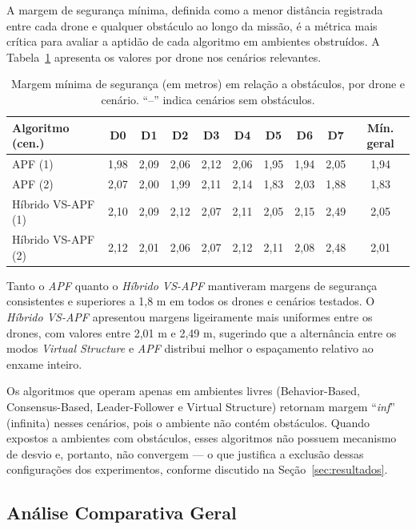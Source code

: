A margem de segurança mínima, definida como a menor distância registrada entre cada drone e qualquer obstáculo ao longo da missão, é a métrica mais crítica para avaliar a aptidão de cada algoritmo em ambientes obstruídos. A Tabela~\ref{tab:seguranca} apresenta os valores por drone nos cenários relevantes.

\begin{table}[ht]
\centering
\caption{Margem mínima de segurança (em metros) em relação a obstáculos, por drone e cenário. ``--'' indica cenários sem obstáculos.}
\label{tab:seguranca}
\renewcommand{\arraystretch}{1.1}
\begin{tabular}{|p{3.0cm}|c|c|c|c|c|c|c|c|c|}
\hline
\textbf{Algoritmo (cen.)} & \textbf{D0} & \textbf{D1} & \textbf{D2} & \textbf{D3} & \textbf{D4} & \textbf{D5} & \textbf{D6} & \textbf{D7} & \textbf{Mín. geral} \\ \hline
APF (1)          & 1,98 & 2,09 & 2,06 & 2,12 & 2,06 & 1,95 & 1,94 & 2,05 & 1,94 \\ \hline
APF (2)          & 2,07 & 2,00 & 1,99 & 2,11 & 2,14 & 1,83 & 2,03 & 1,88 & 1,83 \\ \hline
Híbrido VS-APF (1) & 2,10 & 2,09 & 2,12 & 2,07 & 2,11 & 2,05 & 2,15 & 2,49 & 2,05 \\ \hline
Híbrido VS-APF (2) & 2,12 & 2,01 & 2,06 & 2,07 & 2,12 & 2,11 & 2,08 & 2,48 & 2,01 \\ \hline
\end{tabular}
\end{table}

Tanto o \textit{APF} quanto o \textit{Híbrido VS-APF} mantiveram margens de segurança consistentes e superiores a 1,8 m em todos os drones e cenários testados. O \textit{Híbrido VS-APF} apresentou margens ligeiramente mais uniformes entre os drones, com valores entre 2,01 m e 2,49 m, sugerindo que a alternância entre os modos \textit{Virtual Structure} e \textit{APF} distribui melhor o espaçamento relativo ao enxame inteiro.

Os algoritmos que operam apenas em ambientes livres (Behavior-Based, Consensus-Based, Leader-Follower e Virtual Structure) retornam margem ``\textit{inf}'' (infinita) nesses cenários, pois o ambiente não contém obstáculos. Quando expostos a ambientes com obstáculos, esses algoritmos não possuem mecanismo de desvio e, portanto, não convergem — o que justifica a exclusão dessas configurações dos experimentos, conforme discutido na Seção~\ref{sec:resultados}.

\subsection{Análise Comparativa Geral}


